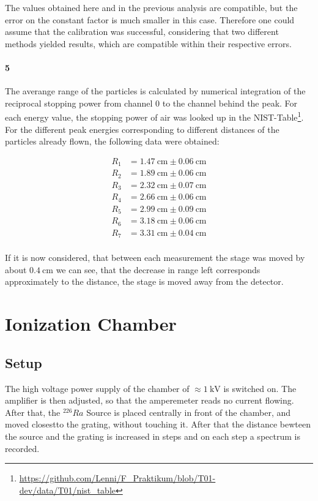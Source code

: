\documentclass[12pt,twoside,a4paper]{scrartcl}
\begin{document}
				The values obtained here and in the previous analysis are compatible, but the error on the constant factor is much smaller in this case. Therefore one could assume that the calibration was successful, considering that two different methods yielded results, which are compatible within their respective errors.


			\paragraph{5}
				The averange range of the particles is calculated by numerical integration of the reciprocal stopping power from channel 0 to the channel behind the peak. For each energy value, the stopping power of air was looked up in the NIST-Table\footnote{\url{https://github.com/Lenni/F_Praktikum/blob/T01-dev/data/T01/nist_table}}. For the different peak energies corresponding to different distances of the particles already flown, the following data were obtained:

				\begin{align*}
					R_1 &= \SI{1.47}{\centi \metre} \pm \SI{0.06}{\centi \metre} \\
					R_2 &= \SI{1.89}{\centi \metre} \pm \SI{0.06}{\centi \metre} \\
					R_3 &= \SI{2.32}{\centi \metre} \pm \SI{0.07}{\centi \metre} \\
					R_4 &= \SI{2.66}{\centi \metre} \pm \SI{0.06}{\centi \metre} \\
					R_5 &= \SI{2.99}{\centi \metre} \pm \SI{0.09}{\centi \metre} \\
					R_6 &= \SI{3.18}{\centi \metre} \pm \SI{0.06}{\centi \metre} \\
					R_7 &= \SI{3.31}{\centi \metre} \pm \SI{0.04}{\centi \metre} \\
				\end{align*}

				If it is now considered, that between each measurement the stage was moved by about $\SI{0.4}{\centi \metre}$ we can see, that the decrease in range left corresponds approximately to the distance, the stage is moved away from the detector.

\section{Ionization Chamber}

	\subsection{Setup}
		 The high voltage power supply of the chamber of $\approx \SI{1}{\kilo \volt}$ is switched on. The amplifier is then adjusted, so that the amperemeter reads no current flowing. After that, the $^{226}Ra$ Source is placed centrally in front of the chamber, and moved closestto the grating, without touching it. After that the distance bewteen the source and the grating is increased in steps and on each step a spectrum is recorded.
\end{document}
